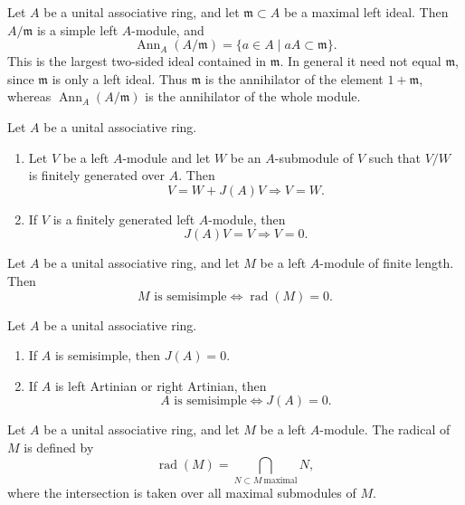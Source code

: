 \begin{remark} \label{rem:annihilator-of-simple-quotient} 
    Let \(A\) be a unital associative ring, and let \(\mathfrak m\subset A\) be a maximal left ideal. Then \(A/\mathfrak m\) is a simple left \(A\)-module, and \[ \operatorname{Ann}_A(A/\mathfrak m) = \{a\in A\mid aA\subset \mathfrak m\}. \] This is the largest two-sided ideal contained in \(\mathfrak m\). In general it need not equal \(\mathfrak m\), since \(\mathfrak m\) is only a left ideal. Thus \(\mathfrak m\) is the annihilator of the element \(1+\mathfrak m\), whereas \(\operatorname{Ann}_A(A/\mathfrak m)\) is the annihilator of the whole module. 
\end{remark}

\begin{theorem} \label{thm:azumaya-nakayama} 
    Let \(A\) be a unital associative ring. 
    \begin{enumerate} 
        \item[(i)] Let \(V\) be a left \(A\)-module and let \(W\) be an \(A\)-submodule of \(V\) such that \(V/W\) is finitely generated over \(A\). Then \[ V=W+J(A)V\Longrightarrow V=W. \] 
        \item[(ii)] If \(V\) is a finitely generated left \(A\)-module, then \[ J(A)V=V\Longrightarrow V=0. \] 
    \end{enumerate} 
\end{theorem}

\begin{theorem}
\label{thm:finite-length-semisimple-radical}
Let \(A\) be a unital associative ring, and let \(M\) be a left \(A\)-module
of finite length. Then
\[
M \text{ is semisimple}
\Longleftrightarrow
\operatorname{rad}(M)=0.
\]
\end{theorem}

\begin{theorem} \label{thm:semisimple-and-jacobson-radical} 
    Let \(A\) be a unital associative ring. 
    \begin{enumerate} 
        \item[(i)] If \(A\) is semisimple, then \(J(A)=0\). 
        \item[(ii)] If \(A\) is left Artinian or right Artinian, then \[ A \text{ is semisimple} \Longleftrightarrow J(A)=0. \] 
    \end{enumerate} 
\end{theorem}


\begin{definition}
\label{def:radical-of-module}
Let \(A\) be a unital associative ring, and let \(M\) be a left
\(A\)-module. The radical of \(M\) is defined by
\[
\operatorname{rad}(M)
=
\bigcap_{N\subset M\ \mathrm{maximal}} N,
\]
where the intersection is taken over all maximal submodules of \(M\).
\end{definition}

